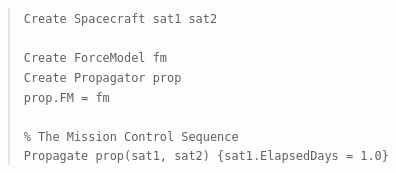 \begin{quote}
\texttt{Create Spacecraft sat1 sat2\\
\\
Create ForceModel fm\\
Create Propagator prop\\
prop.FM = fm\\
\\
\% The Mission Control Sequence\\
Propagate prop(sat1, sat2) \{sat1.ElapsedDays = 1.0\}}
\end{quote}




%
%

